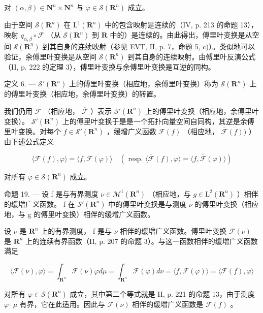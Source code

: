 对 \((\alpha, \beta) \in \mathbf{N}^n \times \mathbf{N}^n\) 与 \(\varphi \in \mathcal{S}(\mathbf{R}^n)\) 成立。

由于空间 \(\mathcal{S}(\mathbf{R}^{n})\) 在 \(\mathrm{L}^{1}(\mathbf{R}^{n})\) 中的包含映射是连续的（IV, p. 213 的命题 13），映射 \(q_{\alpha,\beta} \circ \mathcal{F}\) （从 \(\mathcal{S}(\mathbf{R}^{n})\) 到 \(\mathbf{R}\) 中的）是连续的。由此得出，傅里叶变换是从空间 \(\mathcal{S}(\mathbf{R}^{n})\) 到其自身的连续映射（参见 EVT, II, p. 7，命题 5, c)）。类似地可以验证，余傅里叶变换是从空间 \(\mathcal{S}(\mathbf{R}^{n})\) 到其自身的连续映射。由傅里叶反演公式（II, p. 222 的定理 3），傅里叶变换与余傅里叶变换是互逆的同构。

定义 6. --- \(\mathcal{S}'(\mathbf{R}^n)\) 上的傅里叶变换（相应地，余傅里叶变换）称为 \(\mathcal{S}(\mathbf{R}^n)\) 上的傅里叶变换（相应地，余傅里叶变换）的转置。

我们仍用 \(\mathcal{F}\) （相应地， \(\overline{\mathcal{F}}\) ）表示 \(\mathcal{S}'(\mathbf{R}^n)\) 上的傅里叶变换（相应地，余傅里叶变换）。 \(\mathcal{S}'(\mathbf{R}^n)\) 上的傅里叶变换于是是一个拓扑向量空间自同构，其逆是余傅里叶变换。对每个 \(f \in \mathcal{S}'(\mathbf{R}^n)\) ，缓增广义函数 \(\mathcal{F}(f)\) （相应地， \(\overline{\mathcal{F}}(f) )\) ）由下述公式定义

\[
\langle \mathcal {F} (f), \varphi \rangle = \langle f, \mathcal {F} (\varphi) \rangle \quad (\text { resp. } \langle \overline {{\mathcal {F}}} (f), \varphi \rangle = \langle f, \overline {{\mathcal {F}}} (\varphi) \rangle)
\]

对所有 \(\varphi\in\mathcal{S}(\mathbf{R}^{n})\) 成立。

命题 19. --- 设 f 是与有界测度 \(\nu \in \mathcal{M}^{1}(\mathbf{R}^{n})\) （相应地，与 \(g \in \mathrm{L}^{2}(\mathbf{R}^{n})\) ）相伴的缓增广义函数。 f 在 \(\mathcal{S}'(\mathbf{R}^{n})\) 中的傅里叶变换是与测度 \(\nu\) 的傅里叶变换（相应地，与 g 的傅里叶变换）相伴的缓增广义函数。

设 \(\nu\) 是 \(\mathbf{R}^{n}\) 上的有界测度， f 是与 \(\nu\) 相伴的缓增广义函数。傅里叶变换 \(\mathcal{F}(\nu)\) 是 \(\mathbf{R}^{n}\) 上的连续有界函数（II, p. 207 的命题 3）。与这一函数相伴的缓增广义函数满足

\[
\langle \mathcal {F} (\nu), \varphi \rangle = \int_ {\mathbf {R} ^ {n}} \mathcal {F} (\nu) \varphi d \mu = \int_ {\mathbf {R} ^ {n}} \mathcal {F} (\varphi) d \nu = \langle f, \mathcal {F} (\varphi) \rangle = \langle \mathcal {F} (f), \varphi \rangle
\]

对所有 \(\varphi\in\mathcal{S}(\mathbf{R}^{n})\) 成立，其中第二个等式就是 II, p. 221 的命题 13，由于测度 \(\varphi\cdot\mu\) 有界，它在此适用。因此与 \(\mathcal{F}(\nu)\) 相伴的缓增广义函数是 \(\mathcal{F}(f)\) 。

